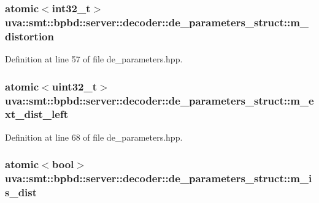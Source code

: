 \subsubsection[{m\+\_\+distortion}]{\setlength{\rightskip}{0pt plus 5cm}atomic$<$int32\+\_\+t$>$ uva\+::smt\+::bpbd\+::server\+::decoder\+::de\+\_\+parameters\+\_\+struct\+::m\+\_\+distortion}\label{structuva_1_1smt_1_1bpbd_1_1server_1_1decoder_1_1de__parameters__struct_aa9ec1effb0a31c054b3751ccb2635642}


Definition at line 57 of file de\+\_\+parameters.\+hpp.

\hypertarget{structuva_1_1smt_1_1bpbd_1_1server_1_1decoder_1_1de__parameters__struct_af649e192d112d6ef69ef60a5606b7211}{}
\subsubsection[{m\+\_\+ext\+\_\+dist\+\_\+left}]{\setlength{\rightskip}{0pt plus 5cm}atomic$<$uint32\+\_\+t$>$ uva\+::smt\+::bpbd\+::server\+::decoder\+::de\+\_\+parameters\+\_\+struct\+::m\+\_\+ext\+\_\+dist\+\_\+left}\label{structuva_1_1smt_1_1bpbd_1_1server_1_1decoder_1_1de__parameters__struct_af649e192d112d6ef69ef60a5606b7211}


Definition at line 68 of file de\+\_\+parameters.\+hpp.

\hypertarget{structuva_1_1smt_1_1bpbd_1_1server_1_1decoder_1_1de__parameters__struct_a3f31a773006e9cd2a83111f5af5d2140}{}
\subsubsection[{m\+\_\+is\+\_\+dist}]{\setlength{\rightskip}{0pt plus 5cm}atomic$<$bool$>$ uva\+::smt\+::bpbd\+::server\+::decoder\+::de\+\_\+parameters\+\_\+struct\+::m\+\_\+is\+\_\+dist}\label{structuva_1_1smt_1_1bpbd_1_1server_1_1decoder_1_1de__parameters__struct_a3f31a773006e9cd2a83111f5af5d2140}


